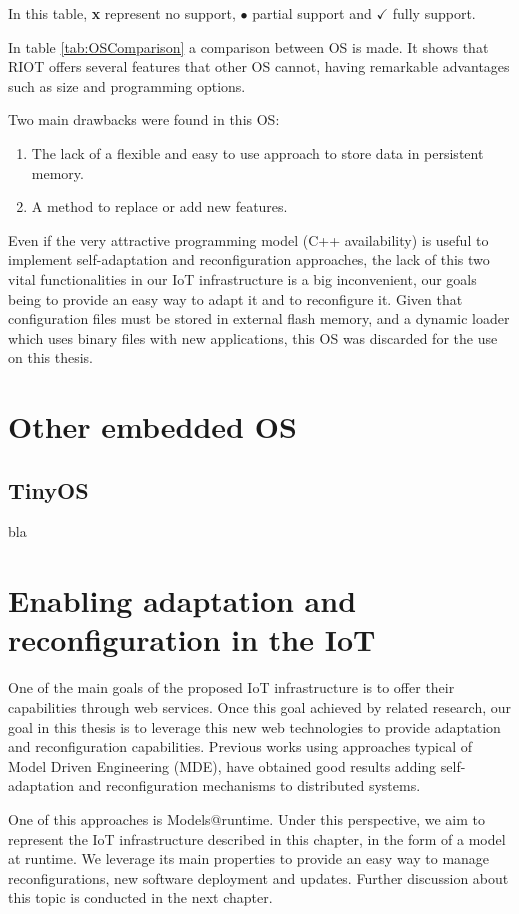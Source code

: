 In this table, \textbf{x} represent no support, $\bullet$ partial support and $\checkmark$ fully support.

In table \ref{tab:OSComparison} a comparison between OS is made.
It shows that RIOT offers several features that other OS cannot, having remarkable advantages such as size and programming options.

Two main drawbacks were found in this OS:
\begin{enumerate}
	\item The lack of a flexible and easy to use approach to store data in persistent memory.
	\item A method to replace or add new features.
\end{enumerate}

Even if the very attractive programming model (C++ availability) is useful to implement self-adaptation and reconfiguration approaches, the lack of this two vital functionalities in our IoT infrastructure is a big inconvenient, our goals being to provide an easy way to adapt it and to reconfigure it.
Given that configuration files must be stored in external flash memory, and a dynamic loader which uses binary files with new applications, this OS was discarded for the use on this thesis.

\section{Other embedded OS}


\subsection{TinyOS}
bla

\section{Enabling adaptation and reconfiguration in the IoT}
One of the main goals of the proposed IoT infrastructure is to offer their capabilities through web services.
Once this goal achieved by related research, our goal in this thesis is to leverage this new web technologies to provide adaptation and reconfiguration capabilities.
Previous works using approaches typical of Model Driven Engineering (MDE), have obtained good results adding self-adaptation and reconfiguration mechanisms to distributed systems.

One of this approaches is Models@runtime\cite{morin2009mar}.
Under this perspective, we aim to represent the IoT infrastructure described in this chapter, in the form of a model at runtime.
We leverage its main properties to provide an easy way to manage reconfigurations, new software deployment and updates.
Further discussion about this topic is conducted in the next chapter.

